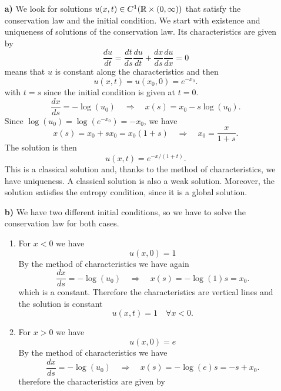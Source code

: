 \begin{itemize}
    \item[\textbf{a)}] We look for solutions \(u(x, t) \in C^1(\mathbb{R} \times (0, \infty))\) that satisfy the conservation law and the initial condition.
          We start with existence and uniqueness of solutions of the conservation law.
          Its characteristics are given by
          \[
              \frac{du}{dt} = \frac{dt}{ds} \frac{du}{dt} + \frac{dx}{ds} \frac{du}{dx} = 0
          \]
          means that \(u\) is constant along the characteristics and then
          \[
              u(x,t) = u(x_0,0) = e^{-x_0}.
          \]
          with \(t=s\) since the initial condition is given at \(t=0\).
          \[
              \frac{dx}{ds} = -\log(u_0) \quad \Rightarrow \quad x(s) = x_0 - s \log(u_0).
          \]
          Since \(\log(u_0) = \log(e^{-x_0}) = -x_0\), we have
          \[
              x(s) = x_0 + s x_0 = x_0(1+s) \quad \Rightarrow \quad x_0 = \frac{x}{1+s}.
          \]
          The solution is then
          \[
              u(x,t) = e^{-x/(1+t)}.
          \]
          This is a classical solution and, thanks to the method of characteristics, we
          have uniqueness. A classical solution is also a weak solution. Moreover, the
          solution satisfies the entropy condition, since it is a global solution.
    \item[\textbf{b)}] We have two different initial conditions, so we have to solve the conservation law for both cases.
          \begin{enumerate}
              \item For \(x < 0\) we have
                    \[
                        u(x,0) = 1
                    \]
                    By the method of characteristics we have again
                    \[
                        \frac{dx}{ds} = -\log(u_0) \quad \Rightarrow \quad x(s) = -\log(1)s = x_0.
                    \]
                    which is a constant. Therefore the characteristics are vertical lines and the
                    solution is constant
                    \[
                        u(x,t) = 1 \quad \forall x < 0.
                    \]
              \item For \(x > 0\) we have
                    \[
                        u(x,0) = e
                    \]
                    By the method of characteristics we have
                    \[
                        \frac{dx}{ds} = -\log(u_0) \quad \Rightarrow \quad x(s) = -\log(e)s = -s + x_0.
                    \]
                    therefore the characteristics are given by

\end{enumerate}
\end{itemize}
